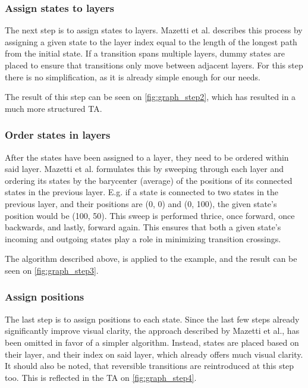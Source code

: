 \begin{center}
    
\end{center}

\subsubsection{Assign states to layers}
The next step is to assign states to layers. Mazetti et al. describes this process by assigning a given state to the layer index equal to the length of the longest path from the initial state. If a transition spans multiple layers, dummy states are placed to ensure that transitions only move between adjacent layers. For this step there is no simplification, as it is already simple enough for our needs. \cite{Mazetti2012}

The result of this step can be seen on \cref{fig:graph_step2}, which has resulted in a much more structured TA.

\begin{center}
    
\end{center}

\subsubsection{Order states in layers}
After the states have been assigned to a layer, they need to be ordered within said layer.
Mazetti et al. formulates this by sweeping through each layer and ordering its states by the barycenter (average) of the positions of its connected states in the previous layer.
E.g. if a state is connected to two states in the previous layer, and their positions are (0, 0) and (0, 100), the given state's position would be (100, 50).
This sweep is performed thrice, once forward, once backwards, and lastly, forward again.
This ensures that both a given state's incoming and outgoing states play a role in minimizing transition crossings. \cite{Mazetti2012}

The algorithm described above, is applied to the example, and the result can be seen on \cref{fig:graph_step3}.
\begin{center}
    
\end{center}

\subsubsection{Assign positions}
The last step is to assign positions to each state.
Since the last few steps already significantly improve visual clarity, the approach described by Mazetti et al., has been omitted in favor of a simpler algorithm. Instead, states are placed based on their layer, and their index on said layer, which already offers much visual clarity. It should also be noted, that reversible transitions are reintroduced at this step too. This is reflected in the TA on \cref{fig:graph_step4}.

\begin{center}
    
\end{center}
